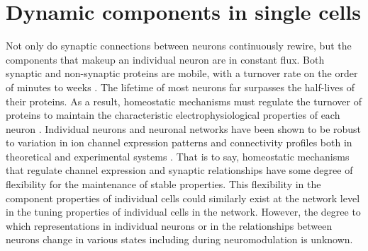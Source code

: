 \section{Dynamic components in single cells}
Not only do synaptic connections between neurons continuously rewire, but the components that makeup an individual neuron are in constant flux. Both synaptic and non-synaptic proteins are mobile, with a turnover rate on the order of minutes to weeks \citep{Bredt2003, Hanus2013}. The lifetime of most neurons far surpasses the half-lives of their proteins. As a result, homeostatic mechanisms must regulate the turnover of proteins to maintain the characteristic electrophysiological properties of each neuron \citep{Marder2006}. Individual neurons and neuronal networks have been shown to be robust to variation in ion channel expression patterns and connectivity profiles both in theoretical and experimental systems \citep{Keck2013, Monier2003, Foster1993, Schulz2006, Taylor2006}. That is to say, homeostatic mechanisms that regulate channel expression and synaptic relationships have some degree of flexibility for the maintenance of stable properties. This flexibility in the component properties of individual cells could similarly exist at the network level in the tuning properties of individual cells in the network. However, the degree to which representations in individual neurons or in the relationships between neurons change in various states including during neuromodulation is unknown.
 

